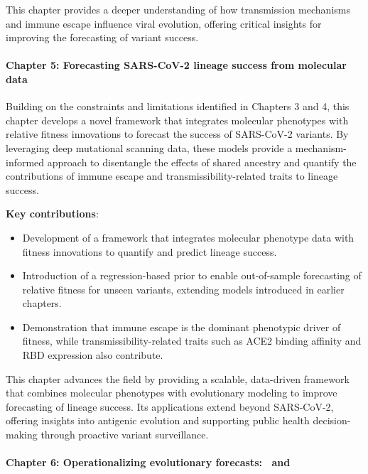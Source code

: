 This chapter provides a deeper understanding of how transmission mechanisms and immune escape influence viral evolution, offering critical insights for improving the forecasting of variant success.

\paragraph{Chapter 5: Forecasting SARS-CoV-2 lineage success from molecular data}

Building on the constraints and limitations identified in Chapters 3 and 4, this chapter develops a novel framework that integrates molecular phenotypes with relative fitness innovations to forecast the success of SARS-CoV-2 variants.
By leveraging deep mutational scanning data, these models provide a mechanism-informed approach to disentangle the effects of shared ancestry and quantify the contributions of immune escape and transmissibility-related traits to lineage success.

\noindent\textbf{Key contributions}:
\begin{itemize}
  \item Development of a framework that integrates molecular phenotype data with fitness innovations to quantify and predict lineage success.
  \item Introduction of a regression-based prior to enable out-of-sample forecasting of relative fitness for unseen variants, extending models introduced in earlier chapters.
  \item Demonstration that immune escape is the dominant phenotypic driver of fitness, while transmissibility-related traits such as ACE2 binding affinity and RBD expression also contribute.
\end{itemize}

This chapter advances the field by providing a scalable, data-driven framework that combines molecular phenotypes with evolutionary modeling to improve forecasting of lineage success.
Its applications extend beyond SARS-CoV-2, offering insights into antigenic evolution and supporting public health decision-making through proactive variant surveillance.

\paragraph{Chapter 6: Operationalizing evolutionary forecasts: \evofr\ and \forecastsNcov}

